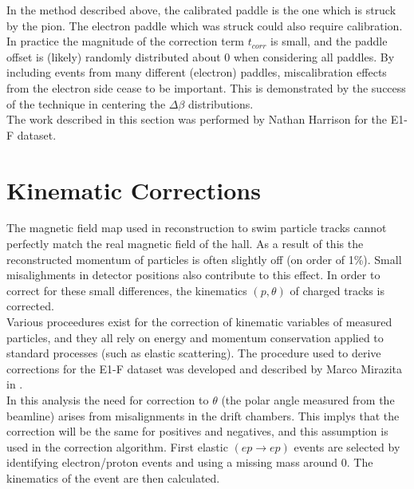 
In the method described above, the calibrated paddle is the one which is struck by the pion.  The electron paddle which was struck could also require calibration.  In practice the magnitude of the correction term $t_{corr}$ is small, and the paddle offset is (likely) randomly distributed about 0 when considering all paddles.  By including events from many different (electron) paddles, miscalibration effects from the electron side cease to be important.  This is demonstrated by the success of the technique in centering the $\Delta \beta$ distributions.  \\

The work described in this section was performed by Nathan Harrison for the E1-F dataset.

\section{Kinematic Corrections}
The magnetic field map used in reconstruction to swim particle tracks cannot perfectly match the real magnetic field of the hall.  As a result of this the reconstructed momentum of particles is often slightly off (on order of 1\%).  Small misalighments in detector positions also contribute to this effect.  In order to correct for these small differences, the kinematics $(p, \theta)$ of charged tracks is corrected. \\

Various proceedures exist for the correction of kinematic variables of measured particles, and they all rely on energy and momentum conservation applied to standard processes (such as elastic scattering).  The procedure used to derive corrections for the E1-F dataset was developed and described by Marco Mirazita in \cite{physics-mirazita}.  \\

In this analysis the need for correction to $\theta$ (the polar angle measured from the beamline) arises from misalignments in the drift chambers.  This implys that the correction will be the same for positives and negatives, and this assumption is used in the correction algorithm.  First elastic $(ep \rightarrow ep)$ events are selected by identifying electron/proton events and using a missing mass around 0.  The kinematics of the event are then calculated.

